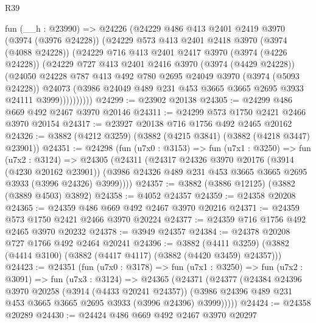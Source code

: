 \begin{lexlean}{R39}
\begin{coremodule}
          fun (__h : @23990) =>
          @24226
            (@24229
              @486
              @413
              @2401
              @2419
              @3970
              (@3974 (@3976 @24228))
              (@24229
                @573
                @413
                @2401
                @2418
                @3970
                (@3974 (@4088 @24228))
                (@24229
                  @716
                  @413
                  @2401
                  @2417
                  @3970
                  (@3974 (@4226 @24228))
                  (@24229
                    @727
                    @413
                    @2401
                    @2416
                    @3970
                    (@3974 (@4429 @24228))
                    (@24050
                      @24228
                      @787
                      @413
                      @492
                      @780
                      @2695
                      @24049
                      @3970
                      (@3974 (@5093 @24228))
                      @24073
                      (@3986 @24049 @489 @231 @453 @3665 @3665 @2695 @3933 @24111 @3999))))))))))
@24299 := @23902 @20138
@24305 := @24299 @486 @669 @492 @2467 @3970 @20146
@24311 := @24299 @573 @1750 @2421 @2466 @3970 @20154
@24317 := @23927 @20138 @716 @1756 @492 @2465 @20162
@24326 := @3882 (@4212 @3259) (@3882 (@4215 @3841) (@3882 (@4218 @3447) @23901))
@24351 := @24298
    (fun (u7x0 : @3153) =>
    fun (u7x1 : @3250) =>
    fun (u7x2 : @3124) =>
    @24305
      (@24311
        (@24317
          @24326
          @3970
          @20176
          (@3914 (@4230 @20162 @23901))
          (@3986 @24326 @489 @231 @453 @3665 @3665 @2695 @3933 (@3996 @24326) @3999))))
@24357 := @3882 (@3886 @12125) (@3882 (@3889 @4503) @3892)
@24358 := @4052 @24357
@24359 := @24358 @20208
@24365 := @24359 @486 @669 @492 @2467 @3970 @20216
@24371 := @24359 @573 @1750 @2421 @2466 @3970 @20224
@24377 := @24359 @716 @1756 @492 @2465 @3970 @20232
@24378 := @3949 @24357
@24384 := @24378 @20208 @727 @1766 @492 @2464 @20241
@24396 := @3882
    (@4411 @3259)
    (@3882 (@4414 @3100) (@3882 (@4417 @4117) (@3882 (@4420 @3459) @24357)))
@24423 := @24351
    (fun (u7x0 : @3178) =>
    fun (u7x1 : @3250) =>
    fun (u7x2 : @3091) =>
    fun (u7x3 : @3124) =>
    @24365
      (@24371
        (@24377
          (@24384
            @24396
            @3970
            @20258
            (@3914 (@4433 @20241 @24357))
            (@3986 @24396 @489 @231 @453 @3665 @3665 @2695 @3933 (@3996 @24396) @3999)))))
@24424 := @24358 @20289
@24430 := @24424 @486 @669 @492 @2467 @3970 @20297

\end{coremodule}
\end{lexlean}
